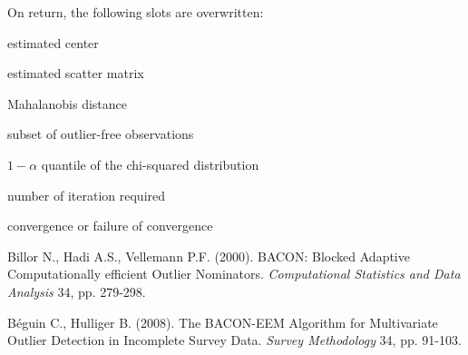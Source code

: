 \documentclass[a4paper,oneside,10pt,DIV=12]{scrartcl}
\begin{document}
\begin{Value}
On return, the following slots are overwritten:
	\begin{ldescription}
		\item[\code{center}] estimated center
		\item[\code{scatter}] estimated scatter matrix
		\item[\code{dist}] Mahalanobis distance
		\item[\code{subset0}] subset of outlier-free observations
		\item[\code{cutoff}] $1-\alpha$ quantile of the chi-squared
			distribution
		\item[\code{maxiter}] number of iteration required
		\item[\code{success}] convergence or failure of convergence
	\end{ldescription}
\end{Value}

\begin{References}
Billor N., Hadi A.S., Vellemann P.F. (2000). BACON: Blocked Adaptive
Computationally efficient Outlier Nominators. \textit{Computational Statistics
and Data Analysis} 34, pp. 279-298.

B{\'e}guin C., Hulliger B. (2008). The BACON-EEM Algorithm for Multivariate
Outlier Detection in Incomplete Survey Data. \textit{Survey Methodology} 34,
pp. 91-103.
\end{References}
\end{document}
